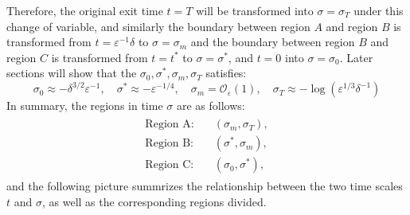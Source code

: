 \documentclass[letterpaper,11pt]{article}
\newcommand{\rmO}{\mathcal{O}}
\newcommand{\eps}{\varepsilon}
\numberwithin{equation}{section}
\theoremstyle{plain}
\begin{document}
Therefore, the original exit time $t=T$ will be transformed into $\sigma=\sigma_T$ under this change of variable, and similarly the boundary between region $A$ and region $B$ is  transformed from $t=\eps^{-1}\delta$ to $\sigma = \sigma_m$ and the boundary between region $B$ and region $C$ is  transformed from $t=t^*$ to $\sigma = \sigma^*$, and $t=0$ into $\sigma = \sigma_0$. Later sections will show that the $\sigma_0, \sigma^*, \sigma_m, \sigma_T$ satisfies:
\[
\sigma _0 \approx -\delta^{3/2}\eps^{-1}, \quad \sigma ^* \approx -\eps^{-1/4}, \quad \sigma_m = \rmO_\eps(1), \quad
\sigma_T \approx -\log(\eps^{1/3}\delta^{-1}) 
\]
In summary, the regions in time $\sigma$ are as follows:
\begin{align}\label{region_division_sig}
\begin{split}
\text{Region A:} & \quad (\sigma_m ,\sigma_T ),  \\
\text{Region B:} & \quad (\sigma^*, \sigma_m),  \\
\text{Region C:} & \quad (\sigma_0, \sigma^*),
\end{split}
\end{align}
and the following picture summrizes the relationship between the two time scales $t$ and $\sigma$, as well as the corresponding regions divided.

\end{document}
